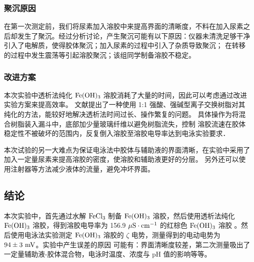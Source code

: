\documentclass[cn,hazy,pku,12pt,normal,math=newtx,cite=super]{elegantnote}
\begin{document}
\subsubsection{聚沉原因}

在第一次测定前，我们将尿素加入溶胶中来提高界面的清晰度，不料在加入尿素之后却发生了聚沉。经过分析讨论，产生聚沉可能有以下原因：仪器未清洗足够干净引入了电解质，使得胶体聚沉；加入尿素的过程中引入了杂质导致聚沉；
在转移的过程中发生震荡等引起溶胶聚沉；该组同学制备溶胶不稳定。

\subsubsection{改进方案}

本次实验中透析法纯化 $\rm Fe(OH)_3$ 溶胶消耗了大量的时间，因此可以考虑通过改进实验方案来提高效率。
文献提出了一种使用 1:1 强酸、强碱型离子交换树脂对其纯化的方法，能较好地解决透析法时间过长、操作繁复的问题。\cite{fwq}
具体操作为将混合树脂装入漏斗中，底部加少量玻璃纤维以避免树脂流失，控制
溶胶流速在胶体稳定性不被破坏的范围内，反复倒入溶胶至溶胶电导率达到电泳实验要求．

本次试验的另一大难点为保证电泳法中胶体与辅助液的界面清晰，在实验中采用了加入一定量尿素来提高溶胶的密度，使溶胶和辅助液更好的分层。
另外还可以使用注射器等方法减少液体的流量，避免冲坏界面。


\subsection{结论}

本次实验中，首先通过水解 $\rm FeCl_3$ 制备 $\rm Fe(OH)_3$ 溶胶，然后使用透析法纯化 $\rm Fe(OH)_3$ 溶胶，得到溶胶电导率为 156.9 $\rm \mu S \cdot cm^{-1}$ 的红棕色 $\rm Fe(OH)_3$ 溶胶
。然后使用电泳法实验测定 $\rm Fe(OH)_3$ 溶胶的 $\zeta$ 电势，测量得到的电动电势为 $94 \pm 3\ \rm mV$。实验中产生误差的原因
可能有：界面清晰度较差，第二次测量吸出了一定量辅助液-胶体混合物，电泳时温度、浓度与 pH 值的影响等等。

\nocite{*}

\end{document}
